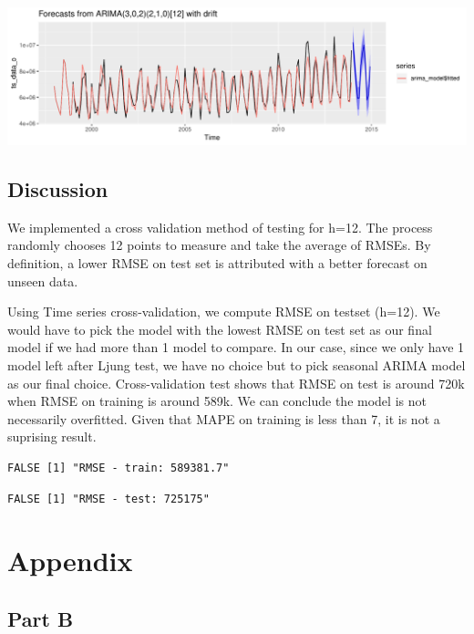 \documentclass[openany]{book}
\begin{document}
\includegraphics{Part-B-AS_files/figure-latex/unnamed-chunk-8-1.pdf}

\hypertarget{b-discussion}{%
\section*{Discussion}\label{b-discussion}}

We implemented a cross validation method of testing for h=12. The
process randomly chooses 12 points to measure and take the average of
RMSEs. By definition, a lower RMSE on test set is attributed with a
better forecast on unseen data.

Using Time series cross-validation, we compute RMSE on testset (h=12).
We would have to pick the model with the lowest RMSE on test set as our
final model if we had more than 1 model to compare. In our case, since
we only have 1 model left after Ljung test, we have no choice but to
pick seasonal ARIMA model as our final choice. Cross-validation test
shows that RMSE on test is around 720k when RMSE on training is around
589k. We can conclude the model is not necessarily overfitted. Given
that MAPE on training is less than 7, it is not a suprising result.

\begin{verbatim}
FALSE [1] "RMSE - train: 589381.7"
\end{verbatim}

\begin{verbatim}
FALSE [1] "RMSE - test: 725175"
\end{verbatim}

\hypertarget{Appendix}{%
\chapter*{Appendix}\label{Appendix}}

\hypertarget{Part-B}{%
\section*{Part B}\label{Part-B}}
\end{document}
